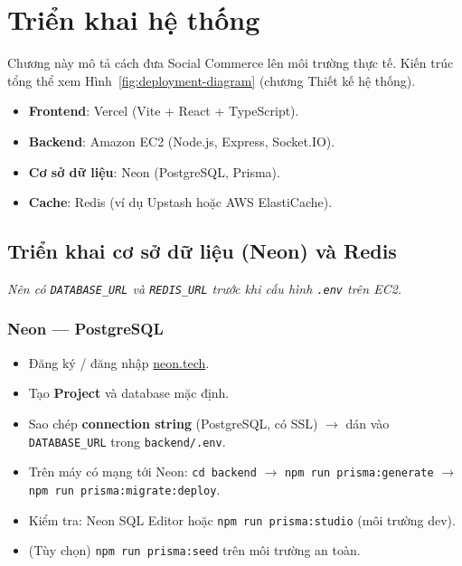 \chapter{Triển khai hệ thống}

Chương này mô tả cách đưa Social Commerce lên môi trường thực tế. Kiến trúc tổng thể xem Hình~\ref{fig:deployment-diagram} (chương Thiết kế hệ thống).

\begin{itemize}
    \item \textbf{Frontend}: Vercel (Vite + React + TypeScript).
    \item \textbf{Backend}: Amazon EC2 (Node.js, Express, Socket.IO).
    \item \textbf{Cơ sở dữ liệu}: Neon (PostgreSQL, Prisma).
    \item \textbf{Cache}: Redis (ví dụ Upstash hoặc AWS ElastiCache).
\end{itemize}

\section{Triển khai cơ sở dữ liệu (Neon) và Redis}

\textit{Nên có \texttt{DATABASE\_URL} và \texttt{REDIS\_URL} trước khi cấu hình \texttt{.env} trên EC2.}

\subsection{Neon --- PostgreSQL}

\begin{itemize}
    \item Đăng ký / đăng nhập \href{https://neon.tech}{neon.tech}.
    \item Tạo \textbf{Project} và database mặc định.
    \item Sao chép \textbf{connection string} (PostgreSQL, có SSL) $\rightarrow$ dán vào \texttt{DATABASE\_URL} trong \texttt{backend/.env}.
    \item Trên máy có mạng tới Neon: \texttt{cd backend} $\rightarrow$ \texttt{npm run prisma:generate} $\rightarrow$ \texttt{npm run prisma:migrate:deploy}.
    \item Kiểm tra: Neon SQL Editor hoặc \texttt{npm run prisma:studio} (môi trường dev).
    \item (Tùy chọn) \texttt{npm run prisma:seed} trên môi trường an toàn.
\end{itemize}

